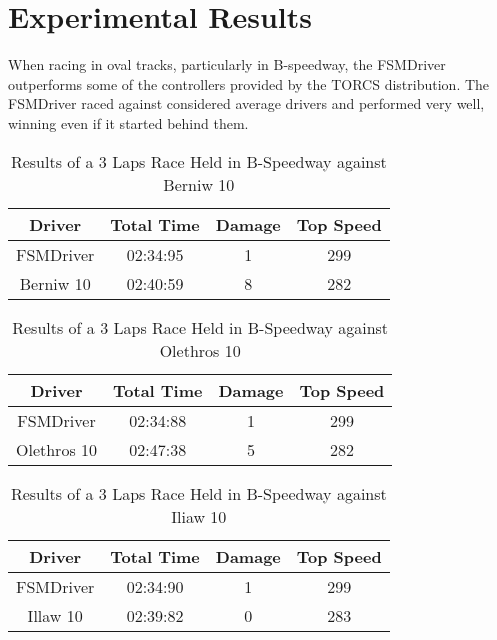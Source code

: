\section{Experimental Results}


When racing in oval tracks, particularly in B-speedway, the FSMDriver outperforms some of the controllers provided by the TORCS distribution. The FSMDriver raced against considered average drivers and performed very well, winning even if it started behind them.

\begin{table}[h]
\renewcommand{\arraystretch}{1.3}
\caption{Results of a 3 Laps Race Held in B-Speedway against Berniw 10}
\label{table_1}
\centering
\begin{tabular}{c||c||c||c}
\hline
\bfseries Driver & \bfseries Total Time & \bfseries Damage & \bfseries Top Speed \\ 
\hline
\hline FSMDriver & 02:34:95 & 1 & 299 \\ 
\hline Berniw 10 & 02:40:59 & 8 & 282 \\ 
\hline 
\end{tabular}
\end{table}

\begin{table}[h]
\renewcommand{\arraystretch}{1.3}
\caption{Results of a 3 Laps Race Held in B-Speedway against Olethros 10}
\label{table_2}
\centering
\begin{tabular}{c||c||c||c}
\hline
\bfseries Driver & \bfseries Total Time & \bfseries Damage & \bfseries Top Speed \\ 
\hline
\hline FSMDriver & 02:34:88 & 1 & 299 \\ 
\hline Olethros 10 & 02:47:38 & 5 & 282 \\ 
\hline 
\end{tabular}
\end{table}

\begin{table}[h]
\renewcommand{\arraystretch}{1.3}
\caption{Results of a 3 Laps Race Held in B-Speedway against Iliaw 10}
\label{table_3}
\centering
\begin{tabular}{c||c||c||c}
\hline
\bfseries Driver & \bfseries Total Time & \bfseries Damage & \bfseries Top Speed \\ 
\hline
\hline FSMDriver & 02:34:90 & 1 & 299 \\ 
\hline Illaw 10 & 02:39:82 & 0 & 283 \\ 
\hline 
\end{tabular}
\end{table}



